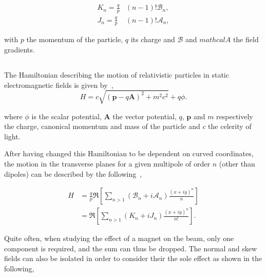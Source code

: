 \begin{equation}
    \begin{aligned}
        K_n =  \frac{q}{p} &(n-1)! \mathcal{B}_n, \\ 
        J_n =  \frac{q}{p} &(n-1)! \mathcal{A}_n,
    \end{aligned}
    \label{eq:magnetic_fields_normalized}
\end{equation}

with $p$ the momentum of the particle, $q$ its charge and $\mathcal{B}$ and $mathcal{A}$ the field
gradients.


\subsection{}

The Hamiltonian describing the motion of relativistic particles in static electromagnetic fields is
given by~\cite{wolski_beam_2014},
\begin{equation}
    H = c \sqrt{(\mathbf{p}-q\mathbf{A})^2 + m^2c^2} + q\phi.
\end{equation}

where $\phi$ is the scalar potential, $\mathbf{A}$ the vector potential, $q$, $\mathbf{p}$ and $m$
respectively the charge, canonical momentum and mass of the particle and $c$ the celerity of light.

After having changed this Hamiltonian to be dependent on curved coordinates, the motion in the
transverse planes for a given multipole of order $n$ (other than dipoles) can be described by the
following~\cite{wolski_beam_2014},

\begin{equation}
    \begin{aligned}
        H &= \frac{q}{p} \Re \left[ \sum_{n>1} (\mathcal{B}_n + i\mathcal{A}_n) \frac{(x+iy)^n}{n} \right] \\
          &= \Re \left[ \sum_{n>1} (K_n + iJ_n) \frac{(x+iy)^n}{n!} \right].
    \end{aligned}
    \label{eq:hamiltonian_magnet}
\end{equation}

Quite often, when studying the effect of a magnet on the beam, only one component is required, and
the sum can thus be dropped.
The normal and skew fields can also be isolated in order to consider their the sole effect as shown
in the following,

